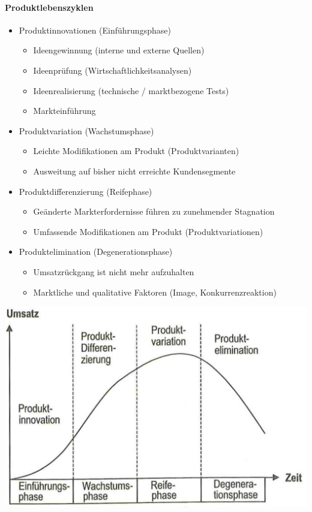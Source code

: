 \paragraph{Produktlebenszyklen}
\begin{itemize}
	\item Produktinnovationen (Einführungsphase)
	\begin{itemize}
		\item Ideengewinnung (interne und externe Quellen)
		\item Ideenprüfung (Wirtschaftlichkeitsanalysen)
		\item Ideenrealisierung (technische / marktbezogene Tests)
		\item Markteinführung
	\end{itemize}
	\item Produktvariation (Wachstumsphase)
	\begin{itemize}
		\item Leichte Modifikationen am Produkt (Produktvarianten)
		\item Ausweitung auf bisher nicht erreichte Kundensegmente
	\end{itemize}
	\item Produktdifferenzierung (Reifephase)
	\begin{itemize}
		\item Geänderte Markterfordernisse führen zu zunehmender Stagnation
		\item Umfassende Modifikationen am Produkt (Produktvariationen)
	\end{itemize}
	\item Produktelimination (Degenerationsphase)
	\begin{itemize}
		\item Umsatzrückgang ist nicht mehr aufzuhalten
		\item Marktliche und qualitative Faktoren (Image, Konkurrenzreaktion)
	\end{itemize}
\end{itemize}
\includegraphics[width=0.5\linewidth]{images/produktlebenszyklen}

